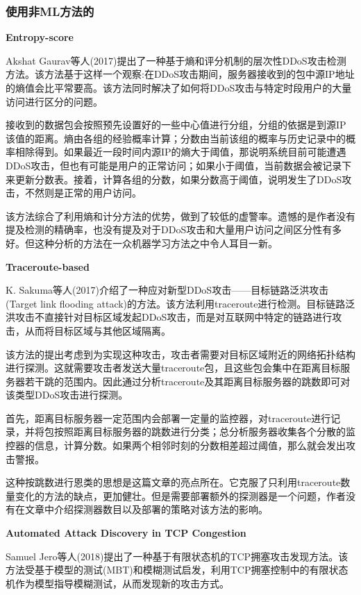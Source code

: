 \documentclass[12pt]{article} %
\begin{document}
\textbf{}

\subsubsection{使用非ML方法的}
\label{nonml}

\textbf{Entropy-score}

Akshat Gaurav等人(2017)提出了一种基于熵和评分机制的层次性DDoS攻击检测方法。该方法基于这样一个观察:在DDoS攻击期间，服务器接收到的包中源IP地址的熵值会比平常要高。该方法同时解决了如何将DDoS攻击与特定时段用户的大量访问进行区分的问题。

接收到的数据包会按照预先设置好的一些中心值进行分组，分组的依据是到源IP该值的距离。熵由各组的经验概率计算；分数由当前该组的概率与历史记录中的概率相除得到。如果最近一段时间内源IP的熵大于阈值，那说明系统目前可能遭遇DDoS攻击，但也有可能是用户的正常访问；如果小于阈值，当前数据会被记录下来更新分数表。接着，计算各组的分数，如果分数高于阈值，说明发生了DDoS攻击，不然则是正常的用户访问。

该方法综合了利用熵和计分方法的优势，做到了较低的虚警率。遗憾的是作者没有提及检测的精确率，也没有提及对于DDoS攻击和大量用户访问之间区分性有多好。但这种分析的方法在一众机器学习方法之中令人耳目一新。

\textbf{Traceroute-based}

K. Sakuma等人(2017)介绍了一种应对新型DDoS攻击——目标链路泛洪攻击(Target link flooding attack)的方法。该方法利用traceroute进行检测。目标链路泛洪攻击不直接针对目标区域发起DDoS攻击，而是对互联网中特定的链路进行攻击，从而将目标区域与其他区域隔离。

该方法的提出考虑到为实现这种攻击，攻击者需要对目标区域附近的网络拓扑结构进行探测。这就需要攻击者发送大量traceroute包，且这些包会集中在距离目标服务器若干跳的范围内。因此通过分析traceroute及其距离目标服务器的跳数即可对该类型DDoS攻击进行探测。

首先，距离目标服务器一定范围内会部署一定量的监控器，对traceroute进行记录，并将包按照距离目标服务器的跳数进行分类；总分析服务器收集各个分散的监控器的信息，计算分数。如果两个相邻时刻的分数相差超过阈值，那么就会发出攻击警报。

这种按跳数进行恩类的思想是这篇文章的亮点所在。它克服了只利用traceroute数量变化的方法的缺点，更加健壮。但是需要部署额外的探测器是一个问题，作者没有在文章中介绍探测器数目以及部署的策略对该方法的影响。

\textbf{Automated Attack Discovery in TCP Congestion}

Samuel Jero等人(2018)提出了一种基于有限状态机的TCP拥塞攻击发现方法。该方法受基于模型的测试(MBT)和模糊测试启发，利用TCP拥塞控制中的有限状态机作为模型指导模糊测试，从而发现新的攻击方式。
\end{document}
